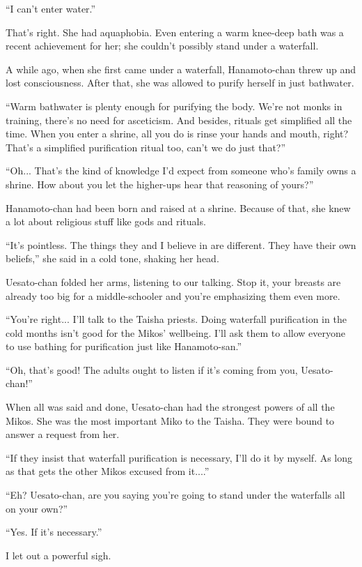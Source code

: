``I can't enter water.''

That's right. She had aquaphobia. Even entering a warm knee-deep bath was a recent achievement for her; she couldn't possibly stand under a waterfall.

A while ago, when she first came under a waterfall, Hanamoto-chan threw up and lost consciousness. After that, she was allowed to purify herself in just bathwater.

``Warm bathwater is plenty enough for purifying the body. We're not monks in training, there's no need for asceticism. And besides, rituals get simplified all the time. When you enter a shrine, all you do is rinse your hands and mouth, right? That's a simplified purification ritual too, can't we do just that?''

``Oh... That's the kind of knowledge I'd expect from someone who's family owns a shrine. How about you let the higher-ups hear that reasoning of yours?''

Hanamoto-chan had been born and raised at a shrine. Because of that, she knew a lot about religious stuff like gods and rituals.

``It's pointless. The things they and I believe in are different. They have their own beliefs,'' she said in a cold tone, shaking her head.

Uesato-chan folded her arms, listening to our talking. Stop it, your breasts are already too big for a middle-schooler and you're emphasizing them even more.

``You're right... I'll talk to the Taisha priests. Doing waterfall purification in the cold months isn't good for the Mikos' wellbeing. I'll ask them to allow everyone to use bathing for purification just like Hanamoto-san.''

``Oh, that's good! The adults ought to listen if it's coming from you, Uesato-chan!''

When all was said and done, Uesato-chan had the strongest powers of all the Mikos. She was the most important Miko to the Taisha. They were bound to answer a request from her.

``If they insist that waterfall purification is necessary, I'll do it by myself. As long as that gets the other Mikos excused from it....''

``Eh? Uesato-chan, are you saying you're going to stand under the waterfalls all on your own?''

``Yes. If it's necessary.''

I let out a powerful sigh.

